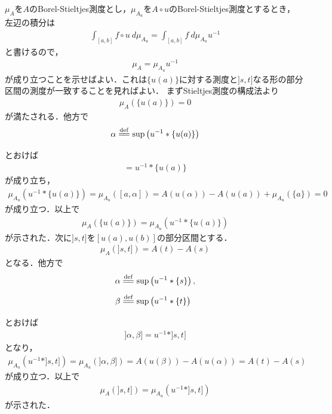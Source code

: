 	\begin{sketch}
		$\mu_A$を$A$のBorel-Stieltjes測度とし，$\mu_{A_u}$を$A \circ u$のBorel-Stieltjes測度とするとき，
		左辺の積分は
		\begin{align}
			\int_{[a,b]} f \circ u\ d\mu_{A_u} = \int_{[a,b]} f\ d\mu_{A_u}u^{-1}
		\end{align}
		と書けるので，
		\begin{align}
			\mu_A = \mu_{A_u} u^{-1}
		\end{align}
		が成り立つことを示せばよい．これは$\{u(a)\}$に対する測度と$]s,t]$なる形の部分区間の測度が一致することを見ればよい．
		まずStieltjes測度の構成法より
		\begin{align}
			\mu_A(\{u(a)\}) = 0
		\end{align}
		が満たされる．他方で
		\begin{align}
			\alpha \defeq \sup{}{\left( u^{-1} \ast \{u(a)\} \right)}
		\end{align}
		とおけば
		\begin{align}
			[a,\alpha] = u^{-1} \ast \{u(a)\}
		\end{align}
		が成り立ち，
		\begin{align}
			\mu_{A_u} \left( u^{-1} \ast \{u(a)\} \right)
			= \mu_{A_u}([a,\alpha])
			= A(u(\alpha)) - A(u(a)) + \mu_{A_u}(\{a\})
			= 0
		\end{align}
		が成り立つ．以上で
		\begin{align}
			\mu_A(\{u(a)\}) = \mu_{A_u} \left( u^{-1} \ast \{u(a)\} \right)
		\end{align}
		が示された．次に$]s,t]$を$[u(a),u(b)]$の部分区間とする．
		\begin{align}
			\mu_A(]s,t]) = A(t) - A(s)
		\end{align}
		となる．他方で
		\begin{align}
			\alpha &\defeq \sup{}{\left( u^{-1} \ast \{s\} \right)}, \\
			\beta &\defeq \sup{}{\left( u^{-1} \ast \{t\} \right)}
		\end{align}
		とおけば
		\begin{align}
			]\alpha,\beta] = u^{-1} \ast ]s,t]
		\end{align}
		となり，
		\begin{align}
			\mu_{A_u} \left( u^{-1} \ast ]s,t] \right) = \mu_{A_u}(]\alpha,\beta])
			= A(u(\beta)) - A(u(\alpha))
			= A(t) - A(s)
		\end{align}
		が成り立つ．以上で
		\begin{align}
			\mu_A(]s,t]) = \mu_{A_u} \left( u^{-1} \ast ]s,t] \right)
		\end{align}
		が示された．
		\QED
	\end{sketch}